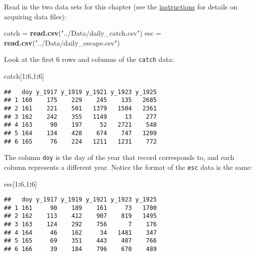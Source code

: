 \documentclass[]{book}
\newenvironment{Shaded}{\begin{snugshade}}{\end{snugshade}}
\newcommand{\KeywordTok}[1]{\textcolor[rgb]{0.13,0.29,0.53}{\textbf{#1}}}
\newcommand{\DecValTok}[1]{\textcolor[rgb]{0.00,0.00,0.81}{#1}}
\newcommand{\StringTok}[1]{\textcolor[rgb]{0.31,0.60,0.02}{#1}}
\newcommand{\OperatorTok}[1]{\textcolor[rgb]{0.81,0.36,0.00}{\textbf{#1}}}
\newcommand{\NormalTok}[1]{#1}
\theoremstyle{definition}
\theoremstyle{definition}
\theoremstyle{definition}
\theoremstyle{remark}
\begin{document}
Read in the two data sets for this chapter (see the
\protect\hyperlink{data-sets}{instructions} for details on acquiring
data files):

\begin{Shaded}
\begin{Highlighting}[]
\NormalTok{catch =}\StringTok{ }\KeywordTok{read.csv}\NormalTok{(}\StringTok{"../Data/daily_catch.csv"}\NormalTok{)}
\NormalTok{esc =}\StringTok{ }\KeywordTok{read.csv}\NormalTok{(}\StringTok{"../Data/daily_escape.csv"}\NormalTok{)}
\end{Highlighting}
\end{Shaded}

Look at the first 6 rows and columns of the \texttt{catch} data:

\begin{Shaded}
\begin{Highlighting}[]
\NormalTok{catch[}\DecValTok{1}\OperatorTok{:}\DecValTok{6}\NormalTok{,}\DecValTok{1}\OperatorTok{:}\DecValTok{6}\NormalTok{]}
\end{Highlighting}
\end{Shaded}

\begin{verbatim}
##   doy y_1917 y_1919 y_1921 y_1923 y_1925
## 1 160    175    229    245    135   2685
## 2 161    221    501   1379   1504   2361
## 3 162    242    355   1149     13    277
## 4 163     90    197     52   2721    548
## 5 164    134    428    674    747   1209
## 6 165     76    224   1211   1231    772
\end{verbatim}

The column \texttt{doy} is the day of the year that record corresponds
to, and each column represents a different year. Notice the format of
the \texttt{esc} data is the same:

\begin{Shaded}
\begin{Highlighting}[]
\NormalTok{esc[}\DecValTok{1}\OperatorTok{:}\DecValTok{6}\NormalTok{,}\DecValTok{1}\OperatorTok{:}\DecValTok{6}\NormalTok{]}
\end{Highlighting}
\end{Shaded}

\begin{verbatim}
##   doy y_1917 y_1919 y_1921 y_1923 y_1925
## 1 161     90    189    161     73   1700
## 2 162    113    412    907    819   1495
## 3 163    124    292    756      7    176
## 4 164     46    162     34   1481    347
## 5 165     69    351    443    407    766
## 6 166     39    184    796    670    489
\end{verbatim}
\end{document}
